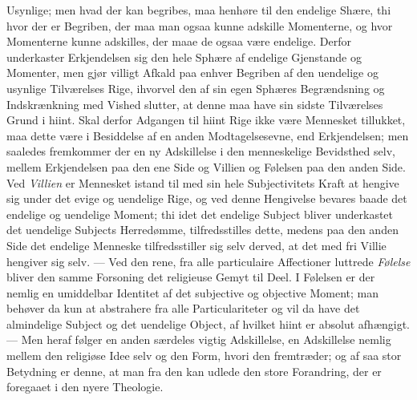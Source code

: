 \documentclass[12pt]{book}
\newcommand{\opage}[1]{\marginnote{\footnotesize\textit{[#1]}}}
\begin{document}
Usynlige; men hvad der kan begribes, maa henhøre til den endelige Shære, thi
hvor der er Begriben, der maa man ogsaa kunne adskille Momenterne, og hvor
Momenterne kunne adskilles, der maae de ogsaa være endelige. Derfor
underkaster Erkjendelsen sig den hele Sphære af endelige Gjenstande og
Momenter, men gjør villigt Afkald paa enhver Begriben af den uendelige og
usynlige Tilværelses Rige, ihvorvel den af sin egen Sphæres Begrændsning og
Indskrænkning med Vished slutter, at denne maa have sin sidste Tilværelses
Grund i hiint. Skal derfor Adgangen til hiint Rige ikke være Mennesket
tillukket, maa dette være i Besiddelse af en anden Modtagelsesevne, end
Erkjendelsen; men saaledes fremkommer der en ny Adskillelse i den menneskelige
Bevidsthed selv, mellem Erkjendelsen paa den ene Side og Villien og Følelsen
paa den anden Side.
\opage{98} Ved \emph{Villien} er Mennesket istand til med sin hele Subjectivitets Kraft at
hengive sig under det evige og uendelige Rige, og ved denne Hengivelse bevares
baade det endelige og uendelige Moment; thi idet det endelige Subject bliver
underkastet det uendelige Subjects Herredømme, tilfredsstilles dette, medens
paa den anden Side det endelige Menneske tilfredsstiller sig selv derved, at
det med fri Villie hengiver sig selv. --- Ved den rene, fra alle particulaire
Affectioner luttrede \emph{Følelse} bliver den samme Forsoning det religieuse
Gemyt til Deel. I Følelsen er der nemlig en umiddelbar Identitet af det
subjective og objective Moment; man behøver da kun at abstrahere fra alle
Particulariteter og vil da have det almindelige Subject og det uendelige
Object, af hvilket hiint er absolut afhængigt. --- Men heraf følger en anden
særdeles vigtig Adskillelse, en Adskillelse nemlig mellem den religiøse Idee
selv og den Form, hvori den fremtræder; og af saa stor Betydning er denne, at
man fra den kan udlede den store Forandring, der er foregaaet i den nyere
Theologie.
\end{document}
